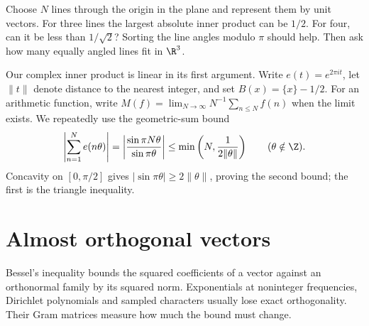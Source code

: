 \begin{think}
Choose $N$ lines through the origin in the plane and represent them by unit vectors. For three lines the largest absolute inner product can be $1/2$. For four, can it be less than $1/\sqrt2$? Sorting the line angles modulo $\pi$ should help. Then ask how many equally angled lines fit in $\R^3$.
\end{think}

Our complex inner product is linear in its first argument. Write $e(t)=e^{2\pi it}$, let $\|t\|$ denote distance to the nearest integer, and set $B(x)=\{x\}-1/2$. For an arithmetic function, write $M(f)=\lim_{N\to\infty}N^{-1}\sum_{n\le N}f(n)$ when the limit exists. We repeatedly use the geometric-sum bound
\begin{equation}\label{eq:dirichletkernel}
\left|\sum_{n=1}^Ne(n\theta)\right|
 =\left|\frac{\sin\pi N\theta}{\sin\pi\theta}\right|
 \le\min\left(N,\frac1{2\|\theta\|}\right)\qquad(\theta\notin\Z).
\end{equation}
Concavity on $[0,\pi/2]$ gives $|\sin\pi\theta|\ge2\|\theta\|$, proving the second bound; the first is the triangle inequality.

\section{Almost orthogonal vectors}

Bessel's inequality bounds the squared coefficients of a vector against an orthonormal family by its squared norm. Exponentials at noninteger frequencies, Dirichlet polynomials and sampled characters usually lose exact orthogonality. Their Gram matrices measure how much the bound must change.

